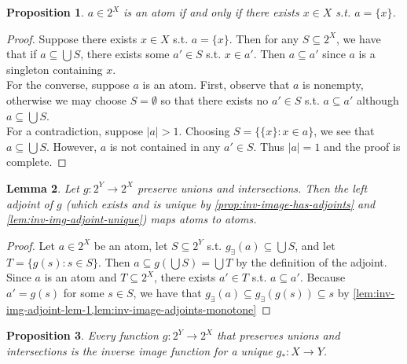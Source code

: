 \documentclass{article}
\newtheorem{proposition}{Proposition}[section]
\newtheorem{lemma}[proposition]{Lemma}
\begin{document}
\begin{proposition}\label{prop:powset-atoms-are-singletons}
$a \in 2^X$ is an atom if and only if there exists $x \in X$ s.t. $a = \{x\}$.
\end{proposition}

\begin{proof}
Suppose there exists $x \in X$ s.t. $a = \{x\}$. Then for any $S \subseteq 2^X$, we have that if $a \subseteq \bigcup S$, there exists some $a' \in S$ s.t. $x \in a'$. Then $a \subseteq a'$ since $a$ is a singleton containing $x$. \\ 

For the converse, suppose $a$ is an atom. First, observe that $a$ is nonempty, otherwise we may choose $S = \emptyset$ so that there exists no $a' \in S$ s.t. $a \subseteq a'$ although $a \subseteq \bigcup S$. \\

For a contradiction, suppose $|a| > 1$. Choosing $S = \{\{x\} : x \in a\}$, we see that $a \subseteq \bigcup S$. However, $a$ is not contained in any $a' \in S$. Thus $|a| = 1$ and the proof is complete.
\end{proof}

\begin{lemma}\label{lem:left-adjoint-maps-atoms-to-atoms}
Let $g : 2^Y \to 2^X$ preserve unions and intersections. Then the left adjoint of $g$ (which exists and is unique by \cref{prop:inv-image-has-adjoints} and \cref{lem:inv-img-adjoint-unique}) maps atoms to atoms. 
\end{lemma}

\begin{proof}
Let $a \in 2^X$ be an atom, let $S \subseteq 2^Y$ s.t. $g_\exists(a) \subseteq \bigcup S$, and let $T = \{g(s) : s \in S\}$. Then $a \subseteq g(\bigcup S) = \bigcup T$ by the definition of the adjoint. Since $a$ is an atom and $T \subseteq 2^X$, there exists $a' \in T$ s.t. $a \subseteq a'$. Because $a' = g(s)$ for some $s \in S$, we have that $g_\exists(a) \subseteq g_\exists(g(s)) \subseteq s$ by \cref{lem:inv-img-adjoint-lem-1,lem:inv-image-adjoints-monotone}
\end{proof}

\begin{proposition} \label{prop:powset-morphism-is-inv-image}
Every function $g : 2^Y \to 2^X$ that preserves unions and intersections is the inverse image function for a unique $g_* : X \to Y$. 
\end{proposition}
\end{document}
